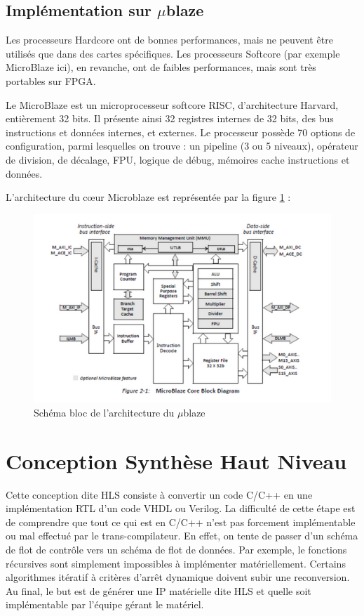 \documentclass[12pt,a4paper]{article}
\begin{document}
\subsection{Implémentation sur $\mu$blaze}
Les processeurs Hardcore ont de bonnes performances, mais ne peuvent être utilisés que dans des cartes spécifiques. Les processeurs Softcore (par exemple MicroBlaze ici), en revanche, ont de faibles performances, mais sont très portables sur FPGA.

Le MicroBlaze est un microprocesseur softcore RISC, d'architecture Harvard, entièrement 32 bits. Il présente ainsi 32 registres internes de 32 bits, des bus instructions et données internes, et externes.
Le processeur possède 70 options de configuration, parmi lesquelles on trouve : un pipeline (3 ou 5 niveaux), opérateur de division, de décalage, FPU, logique de débug, mémoires cache instructions et données.

L’architecture du cœur Microblaze est représentée par la figure \ref{fig:screenshot004} :
\begin{figure}[H]
	\centering
	\includegraphics[trim= 0  20 0 0,clip,width=0.8\linewidth]{soft/screenshot004}
	\caption{Schéma bloc de l'architecture du $\mu$blaze}
	\label{fig:screenshot004}
\end{figure}


\section{Conception Synthèse Haut Niveau}
Cette conception dite HLS consiste à convertir un code C/C++ en une implémentation RTL d'un code VHDL ou Verilog. La difficulté de cette étape est de comprendre que tout ce qui est en C/C++ n'est pas forcement implémentable ou mal effectué par le trans-compilateur. En effet, on tente de passer d'un schéma de flot de contrôle vers un schéma de flot de données. Par exemple, le fonctions récursives sont simplement impossibles à implémenter matériellement. Certains algorithmes itératif à critères d'arrêt dynamique doivent subir une reconversion. Au final, le but est de générer une IP matérielle dite HLS et quelle soit implémentable par l'équipe gérant le matériel.
\end{document}
